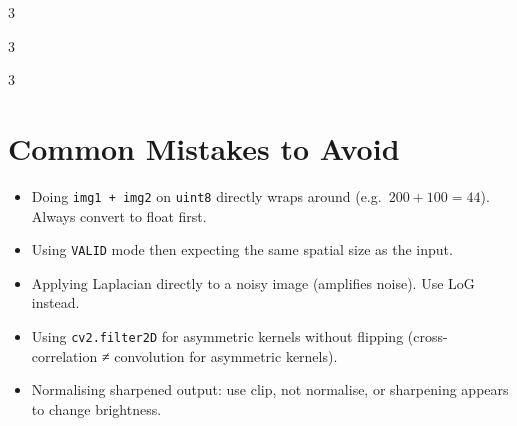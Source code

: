 \documentclass[9pt,landscape,a4paper]{extarticle}
\begin{document}
\begin{multicols*}{3}
\begin{multicols*}{3}
\begin{multicols}{3}
\section{Common Mistakes to Avoid}

\begin{notebox}
\begin{itemize}
  \item Doing \texttt{img1 + img2} on \texttt{uint8} directly wraps around (e.g.\ $200 + 100 = 44$). Always convert to float first.
  \item Using \texttt{VALID} mode then expecting the same spatial size as the input.
  \item Applying Laplacian directly to a noisy image (amplifies noise). Use LoG instead.
  \item Using \texttt{cv2.filter2D} for asymmetric kernels without flipping (cross-correlation ≠ convolution for asymmetric kernels).
  \item Normalising sharpened output: use clip, not normalise, or sharpening appears to change brightness.
\end{itemize}
\end{notebox}

\end{multicols}

\end{multicols*}

\end{multicols*}
\end{document}

